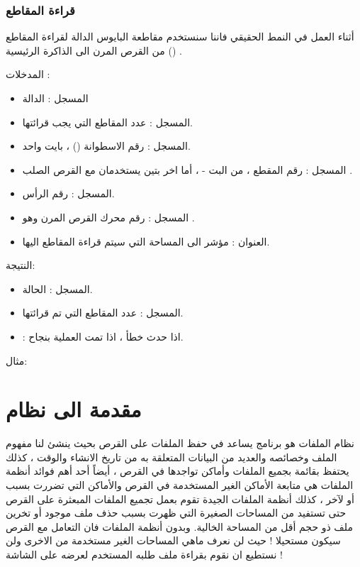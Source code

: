 \documentclass[document.tex]{subfiles}
\begin{document}
\subsubsection{قراءة المقاطع }
أثناء العمل في النمط الحقيقي فاننا سنستخدم مقاطعة البايوس  الدالة  لقراءة المقاطع () من القرص المرن الى الذاكرة الرئيسية  .

المدخلات :
\begin{itemize}
\item المسجل : الدالة 
\item المسجل : عدد المقاطع التي يجب قرائتها.
\item المسجل : رقم الاسطوانة  () ، بايت واحد.
\item المسجل : رقم المقطع ، من البت  -  ، أما اخر بتين يستخدمان مع القرص الصلب .
\item المسجل : رقم الرأس.
\item المسجل  : رقم محرك القرص المرن وهو .
\item العنوان  : مؤشر الى المساحة التي سيتم قراءة المقاطع اليها.
\end{itemize}
النتيجة:
\begin{itemize}
\item المسجل  : الحالة.
\item المسجل : عدد المقاطع التي تم قرائتها.
\item {} :  اذا حدث خطأ ،  اذا تمت العملية بنجاح.

\end{itemize}

مثال:\\
\begin{english}
\lstset{numberstyle=\tiny,numbersep=5pt,tabsize=2,extendedchars=true,breaklines=true,frame=b,showspaces=false, showtabs=false,xleftmargin=10pt,framexleftmargin=10pt,framexrightmargin=5pt,framexbottommargin=4pt,showstringspaces=false,language=[x86masm]Assembler}


\end{english}


\section{مقدمة الى نظام }
نظام الملفات هو برنامج يساعد في حفظ الملفات على القرص بحيث ينشئ لنا مفهوم الملف وخصائصه والعديد من البيانات المتعلقة به من تاريخ الانشاء والوقت ، كذلك يحتفظ بقائمة بجميع الملفات وأماكن تواجدها في القرص ، أيضاً أحد أهم فوائد أنظمة الملفات هي متابعة الأماكن الغير المستخدمة في القرص والأماكن التي تضررت بسبب أو لآخر  ، كذلك أنظمة الملفات الجيدة تقوم بعمل تجميع الملفات المبعثرة على القرص  حتى تستفيد من المساحات الصغيرة التي ظهرت بسبب حذف ملف موجود أو تخرين ملف ذو حجم أقل من المساحة الخالية.
وبدون أنظمة الملفات فان التعامل مع القرص سيكون مستحيلا ! حيث لن نعرف ماهي المساحات الغير مستخدمة من الاخرى ولن نستطيع ان نقوم بقراءة ملف طلبه المستخدم لعرضه على الشاشة !
\end{document}
